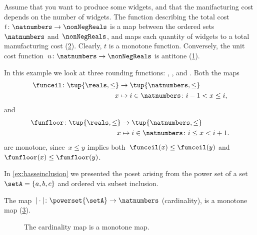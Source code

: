 \begin{example}
  Assume that you want to produce some widgets, and that the manifacturing cost depends on the number of widgets.
  The function describing the total cost~$t\colon \natnumbers\to \nonNegReals$ is a map between the ordered sets~$\natnumbers$ and~$\nonNegReals$, and maps each quantity of widgets to a total manufacturing cost (\cref{fig:total_manufacturing}).
  Clearly, $t$ is a monotone function.
  Conversely, the unit cost function~$u\colon \natnumbers\to \nonNegReals$ is antitone (\cref{fig:unit_manufacturing}).
\end{example}

\begin{figure}[h!]
  \caption{}
  \label{fig:unit_manufacturing}
\end{figure}

\begin{figure}[h!]
  \caption{}
  \label{fig:total_manufacturing}
\end{figure}





\begin{example}
  \label{ex:rounding-functions}
  In this example we look at three rounding functions: \funceil, \funfloor, and \rtntte. Both the maps
  \begin{equation*}
    \begin{aligned}
      \funceil\colon \tup{\reals,\leq}&\to \tup{\natnumbers,\leq}\\
      x&\mapsto i \in \natnumbers \colon i-1<x\leq i,
    \end{aligned}
  \end{equation*}
  and
  \begin{equation*}
    \begin{aligned}
      \funfloor\colon \tup{\reals,\leq}&\to \tup{\natnumbers,\leq}\\
      x&\mapsto i \in \natnumbers \colon i\leq x< i+1.
    \end{aligned}
  \end{equation*}
  are monotone, since~$x\leq y$ implies both~$\funceil(x)\leq \funceil(y)$ and~$\funfloor(x)\leq\funfloor(y)$.
\end{example}

\begin{example}
  In \cref{ex:hasseinclusion} we presented the poset arising from the power set of a set~$\setA=\{a,b,c\}$ and ordered via subset inclusion.

  The map~$\vert \cdot \vert \colon \powerset{\setA} \to \natnumbers$ (cardinality), is a monotone map (\cref{fig:cardinality}).
  \begin{figure}[h!]
    \begin{center}
    \end{center}
    \caption{The cardinality map is a monotone map. \label{fig:cardinality}}
  \end{figure}
\end{example}

